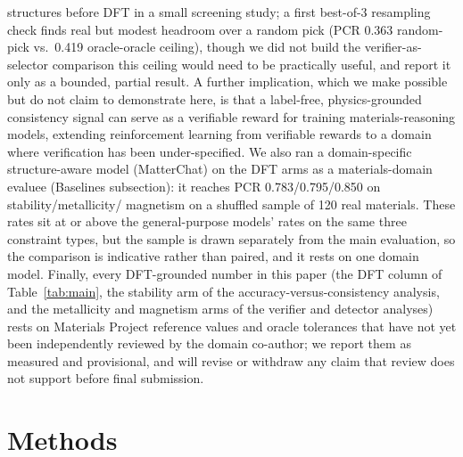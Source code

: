 \documentclass[pdflatex,sn-nature]{sn-jnl}
\begin{document}
structures before DFT in a small screening study; a first best-of-3 resampling check finds
real but modest headroom over a random pick (PCR 0.363 random-pick vs.\ 0.419 oracle-oracle
ceiling), though we did not build the verifier-as-selector comparison this ceiling would
need to be practically useful, and report it only as a bounded, partial result. A further implication,
which we make possible but do not claim to demonstrate here, is that a label-free,
physics-grounded consistency signal can serve as a verifiable reward for training
materials-reasoning models, extending reinforcement learning from verifiable rewards
to a domain where verification has been under-specified.\cite{scirlvr2026} We also ran a
domain-specific structure-aware model (MatterChat) on the DFT arms as a materials-domain
evaluee (Baselines subsection): it reaches PCR 0.783/0.795/0.850 on stability/metallicity/
magnetism on a shuffled sample of 120 real materials. These rates sit at or above the
general-purpose models' rates on the same three constraint types, but the sample is drawn
separately from the main evaluation, so the comparison is indicative rather than paired,
and it rests on one domain model. Finally,
every DFT-grounded number in this paper (the DFT column of Table~\ref{tab:main}, the
stability arm of the accuracy-versus-consistency analysis, and the metallicity and
magnetism arms of the verifier and detector analyses) rests on Materials Project
reference values and oracle tolerances that have not yet been independently reviewed
by the domain co-author; we report them as measured and provisional, and will revise
or withdraw any claim that review does not support before final submission.

\section*{Methods}
\end{document}
